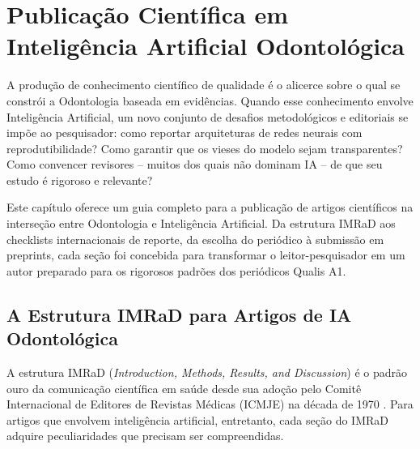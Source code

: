 \chapter{Publicação Científica em Inteligência Artificial Odontológica}
\label{cap:publicacao-cientifica}

\nivelquatro

A produção de conhecimento científico de qualidade é o alicerce sobre o qual se
constrói a Odontologia baseada em evidências. Quando esse conhecimento envolve
Inteligência Artificial, um novo conjunto de desafios metodológicos e editoriais
se impõe ao pesquisador: como reportar arquiteturas de redes neurais com
reprodutibilidade? Como garantir que os vieses do modelo sejam transparentes?
Como convencer revisores -- muitos dos quais não dominam IA -- de que seu estudo
é rigoroso e relevante?

Este capítulo oferece um guia completo para a publicação de artigos científicos
na interseção entre Odontologia e Inteligência Artificial. Da estrutura IMRaD
aos checklists internacionais de reporte, da escolha do periódico à submissão em
preprints, cada seção foi concebida para transformar o leitor-pesquisador em um
autor preparado para os rigorosos padrões dos periódicos Qualis A1.

  
 

\section{A Estrutura IMRaD para Artigos de IA Odontológica}
\label{sec:imrad-ia}

\nivelquatro

A estrutura IMRaD (\textit{Introduction, Methods, Results, and Discussion}) é o
padrão ouro da comunicação científica em saúde desde sua adoção pelo Comitê
Internacional de Editores de Revistas Médicas (ICMJE) na década de 1970
\cite{icmje2024recommendations}. Para artigos que envolvem inteligência
artificial, entretanto, cada seção do IMRaD adquire peculiaridades que precisam
ser compreendidas.

